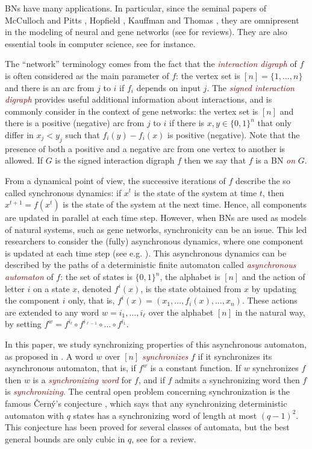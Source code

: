 \documentclass[11pt,letter]{article}
\newcommand{\EM}[1]{{\em\textcolor{Maroon}{#1}}}
\newcommand{\B}{\{0,1\}}
\begin{document}
BNs have many applications. In particular, since the seminal papers of McCulloch and Pitts \cite{MP43}, Hopfield \cite{H82}, Kauffman \cite{K69,K93} and Thomas \cite{T73,TA90}, they are omnipresent in the modeling of neural and gene networks (see \cite{B08,N15} for reviews). They are also essential tools in computer science, see \cite{ANLY00,GRF16,BGT14, CFG14a, GR15b} for instance. 

\medskip
The ``network'' terminology comes from the fact that the \EM{interaction digraph} of $f$ is often considered as the main parameter of $f$: the vertex set is $[n]=\{1,\dots,n\}$ and there is an arc from $j$ to $i$ if $f_i$ depends on input $j$. The \EM{signed interaction digraph} provides useful additional information about interactions, and is commonly consider in the context of gene networks: the vertex set is $[n]$ and there is a positive (negative) arc from $j$ to $i$ if there is $x,y\in \B^n$ that only differ in $x_j<y_j$ such that $f_i(y)-f_i(x)$ is positive (negative). Note that the presence of both a positive and a negative arc from one vertex to another is allowed. If $G$ is the signed interaction digraph $f$ then we say that $f$ is a BN \EM{on} $G$. 

\medskip
From a dynamical point of view, the successive iterations of $f$ describe the so called synchronous dynamics: if $x^t$ is the state of the system at time $t$, then $x^{t+1}=f(x^t)$ is the state of the system at the next time. Hence, all components are updated in parallel at each time step. However, when BNs are used as models of natural systems, such as gene networks, synchronicity can be an issue. This led researchers to consider the (fully) asynchronous dynamics, where one component is updated at each time step (see e.g. \cite{T91,TA90,TK01,A-J16}). This asynchronous dynamics can be described by the paths of a deterministic finite automaton called \EM{asynchronous automaton} of $f$: the set of states is $\B^n$, the alphabet is $[n]$ and   the action of letter $i$ on a state $x$, denoted $f^i(x)$, is the state obtained from $x$ by updating the component $i$ only, that is, $f^i(x)=(x_1,\dots,f_i(x),\dots,x_n)$. These actions are extended to any word $w=i_1,\dots,i_\ell$ over the alphabet $[n]$ in the natural way, by setting $f^w=f^{i_\ell}\circ f^{i_{\ell-1}}\circ\dots\circ f^{i_1}$.

\medskip
In this paper, we study synchronizing properties of this asynchronous automaton, as proposed in \cite{AGRS20}. A word $w$ over $[n]$ \EM{synchronizes} $f$ if it synchronizes its asynchronous automaton, that is, if $f^w$ is a constant function. If $w$ synchronizes $f$ then $w$ is a \EM{synchronizing word} for $f$, and if $f$ admits a synchronizing word then $f$ is \EM{synchronizing}. The central open problem concerning synchronization is the famous \v{C}ern\'y's conjecture \cite{C64,CPR71}, which says that any synchronizing deterministic automaton with $q$ states has a synchronizing word of length at most $(q-1)^2$. This conjecture has been proved for several classes of automata, but the best general bounds are only cubic in $q$, see \cite{V08} for a review.
\end{document}
